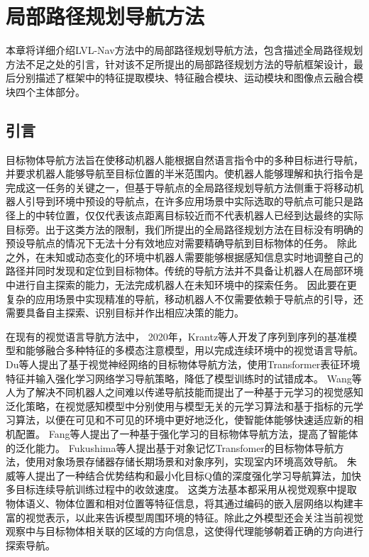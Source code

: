 \chapter{局部路径规划导航方法}
本章将详细介绍LVL-Nav方法中的局部路径规划导航方法，包含描述全局路径规划方法不足之处的引言，针对该不足所提出的局部路径规划方法的导航框架设计，最后分别描述了框架中的特征提取模块、特征融合模块、运动模块和图像点云融合模块四个主体部分。


\section{引言}

目标物体导航方法旨在使移动机器人能根据自然语言指令中的多种目标进行导航，并要求机器人能够导航至目标位置的半米范围内。使机器人能够理解和执行指令是完成这一任务的关键之一，但基于导航点的全局路径规划导航方法侧重于将移动机器人引导到环境中预设的导航点，在许多应用场景中实际选取的导航点可能只是路径上的中转位置，仅仅代表该点距离目标较近而不代表机器人已经到达最终的实际目标旁。出于这类方法的限制，我们所提出的全局路径规划方法在目标没有明确的预设导航点的情况下无法十分有效地应对需要精确导航到目标物体的任务。
除此之外，在未知或动态变化的环境中机器人需要能够根据感知信息实时地调整自己的路径并同时发现和定位到目标物体。传统的导航方法并不具备让机器人在局部环境中进行自主探索的能力，无法完成机器人在未知环境中的探索任务。
因此要在更复杂的应用场景中实现精准的导航，移动机器人不仅需要依赖于导航点的引导，还需要具备自主探索、识别目标并作出相应决策的能力。

在现有的视觉语言导肮方法中，
2020年，Krantz\cite{krantz2020beyond}等人开发了序列到序列的基准模型和能够融合多种特征的多模态注意模型，用以完成连续环境中的视觉语言导航。
Du\cite{du2020learning, du2021vtnet}等人提出了基于视觉神经网络的目标物体导航方法，使用Transformer表征环境特征并输入强化学习网络学习导航策略，降低了模型训练时的试错成本。
Wang\cite{wang2021visual}等人为了解决不同机器人之间难以传递导航技能而提出了一种基于元学习的视觉感知泛化策略，在视觉感知模型中分别使用与模型无关的元学习算法和基于指标的元学习算法，以便在可见和不可见的环境中更好地泛化，使智能体能够快速适应新的相机配置。
Fang\cite{fang2022target}等人提出了一种基于强化学习的目标物体导航方法，提高了智能体的泛化能力。
Fukushima\cite{fukushima2022object}等人提出基于对象记忆Transfomer的目标物体导航方法，使用对象场景存储器存储长期场景和对象序列，实现室内环境高效导航。
朱威\cite{朱威2024结合优势结构和最小目标}等人提出了一种结合优势结构和最小化目标Q值的深度强化学习导航算法，加快多目标连续导航训练过程中的收敛速度。
这类方法基本都采用从视觉观察中提取物体语义、物体位置和相对位置等特征信息，将其通过编码的嵌入层网络以构建丰富的视觉表示，以此来告诉模型周围环境的特征。除此之外模型还会关注当前视觉观察中与目标物体相关联的区域的方向信息，这使得代理能够朝着正确的方向进行探索导航。

